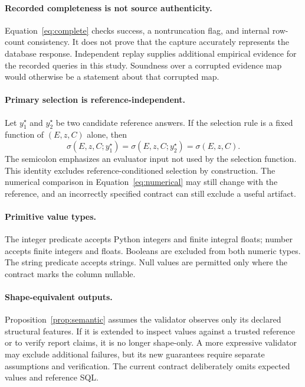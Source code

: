 \documentclass{article}
\begin{document}
\paragraph{Recorded completeness is not source authenticity.} Equation~\eqref{eq:complete} checks success, a nontruncation flag, and internal row-count consistency. It does not prove that the capture accurately represents the database response. Independent replay supplies additional empirical evidence for the recorded queries in this study. Soundness over a corrupted evidence map would otherwise be a statement about that corrupted map.

\paragraph{Primary selection is reference-independent.} Let $y_1^\star$ and $y_2^\star$ be two candidate reference answers. If the selection rule is a fixed function of $(E,z,C)$ alone, then
\begin{equation}
\sigma(E,z,C;y_1^\star)=\sigma(E,z,C;y_2^\star)=\sigma(E,z,C).
\end{equation}
The semicolon emphasizes an evaluator input not used by the selection function. This identity excludes reference-conditioned selection by construction. The numerical comparison in Equation~\eqref{eq:numerical} may still change with the reference, and an incorrectly specified contract can still exclude a useful artifact.

\paragraph{Primitive value types.} The integer predicate accepts Python integers and finite integral floats; number accepts finite integers and floats. Booleans are excluded from both numeric types. The string predicate accepts strings. Null values are permitted only where the contract marks the column nullable.

\paragraph{Shape-equivalent outputs.} Proposition~\ref{prop:semantic} assumes the validator observes only its declared structural features. If it is extended to inspect values against a trusted reference or to verify report claims, it is no longer shape-only. A more expressive validator may exclude additional failures, but its new guarantees require separate assumptions and verification. The current contract deliberately omits expected values and reference SQL.
\end{document}
